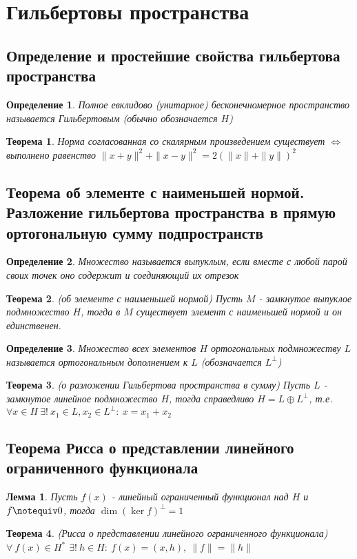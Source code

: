 \documentclass[9pt, a4paper]{extarticle}
\newtheorem{theorem}{Теорема}
\newtheorem{lemma}{Лемма}
\newtheorem{definition}{Определение}
\numberwithin{equation}{section}
\numberwithin{lemma}{section}
\numberwithin{definition}{section}
\numberwithin{notabene}{section}
\numberwithin{corollary}{section}
\begin{document}
	\section{Гильбертовы пространства}
	\subsection{Определение и простейшие свойства гильбертова пространства}
	\begin{definition}
		Полное евклидово (унитарное) бесконечномерное пространство называется Гильбертовым (обычно обозначается $H$)
	\end{definition}
	\begin{theorem}
		Норма согласованная со скалярным произведением существует $\Leftrightarrow$ выполнено равенство $\|x+y\|^2 + \|x-y\|^2 = 2 \left(\|x\| + \|y\|\right)^2$
	\end{theorem}
	\subsection{Теорема об элементе с наименьшей нормой. Разложение гильбертова пространства
		в прямую ортогональную сумму подпространств }
	\begin{definition}
		Множество называется выпуклым, если вместе с любой парой своих точек оно содержит и соединяющий их отрезок		
	\end{definition}
	\begin{theorem}
		(об элементе с наименьшей нормой)\newline
		Пусть $M$ - замкнутое выпуклое подмножество $H$, тогда в $M$ существует элемент с наименьшей нормой и он единственен.
	\end{theorem}
	\begin{definition}
		Множество всех элементов $H$ ортогональных подмножеству $L$ называется ортогональным дополнением к $L$ (обозначается $L^\perp$)
	\end{definition}
	\begin{theorem}
		(о разложении Гильбертова пространства в сумму)\newline
		Пусть $L$ - замкнутое линейное подмножество $H$, тогда справедливо $H = L \oplus L^\perp$, т.е. $\forall x \in H \  \exists! \  x_1 \in L, x_2 \in L^\perp: \ x = x_1 + x_2$
	\end{theorem}
	\subsection{Теорема Рисса о представлении линейного ограниченного функционала}
	\begin{lemma}
		Пусть $f(x)$ - линейный ограниченный функционал над $H$ и $f \notequiv 0$, тогда $\dim{\left(\ker{f}\right)^\perp} = 1$
	\end{lemma}
	\begin{theorem}
		(Рисса о представлении линейного ограниченного функционала)\newline
		$\forall \ f(x) \in H^{*}$ $\exists! \ h \in H: \ f(x) = (x,h), \ \|f\| = \|h\|$
	\end{theorem}
\end{document}
